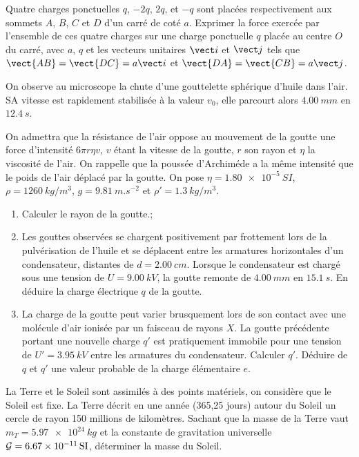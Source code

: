 \begin{exercice}
  Quatre charges ponctuelles $q$, $-2q$, $2q$, et $-q$ sont placées respectivement aux sommets $A$, $B$, $C$ et $D$ d'un carré de coté $a$. Exprimer la force exercée par l'ensemble de ces quatre charges sur une charge ponctuelle $q$ placée au centre $O$ du carré, avec $a$, $q$ et les vecteurs unitaires $\vi$ et $\vj$ tels que $\vect{AB}=\vect{DC}=a\vi$ et $\vect{DA}=\vect{CB}=a\vj$.
\end{exercice}
%
\begin{exercice}
On observe au microscope la chute d'une gouttelette sphérique d'huile dans l'air. SA vitesse est rapidement stabilisée à la valeur $v_0$, elle parcourt alors $\SI{4,00}{mm}$ en $\SI{12,4}{s}$.

On admettra que la résistance de l'air oppose au mouvement de la goutte une force d'intensité $6\pi r \eta v$, $v$ étant la vitesse de la goutte, $r$ son rayon et $\eta$ la viscosité de l'air. On rappelle que la poussée d'Archiméde a la même intensité que le poids de l'air déplacé par la goutte. On pose $\eta=\SI{1,80e-5}{SI}$, $\rho=\SI{1260}{kg/m^3}$, $g=\SI{9.81}{m.s^{-2}}$ et $\rho'=\SI{1,3}{kg/m^3}$.

  \begin{enumerate}
  \item  Calculer le rayon de la goutte.;
  \item Les gouttes observées se chargent positivement par frottement lors de la pulvérisation de l'huile et se déplacent entre les armatures horizontales d'un condensateur, distantes de $d=\SI{2,00}{cm}$. Lorsque le condensateur est chargé sous une tension de $U=\SI{9,00}{kV}$, la goutte remonte de $\SI{4,00}{mm}$ en $\SI{15.1}{s}$. En déduire la charge électrique $q$ de la goutte.
  \item La charge de la goutte peut varier brusquement lors de son contact avec une molécule d'air ionisée par un faisceau de rayons $X$. La goutte précédente portant une nouvelle charge $q'$ est pratiquement immobile pour une tension de $U'=\SI{3,95}{kV}$ entre les armatures du condensateur. Calculer $q'$. Déduire de $q$ et $q'$ une valeur probable de la charge élémentaire $e$.
  \end{enumerate}
\end{exercice}

\begin{exercice}
  La Terre et le Soleil sont assimilés à des points matériels, on considère que le Soleil est fixe. La Terre décrit en une année (365,25 jours) autour du Soleil un cercle de rayon 150 millions de kilomètres. Sachant que la masse de la Terre vaut $m_T=\SI{5,97e24}{kg}$ et la constante de gravitation universelle $\mathcal{G}=\SI{6.67e-11}{SI}$, déterminer la masse du Soleil.
\end{exercice}


